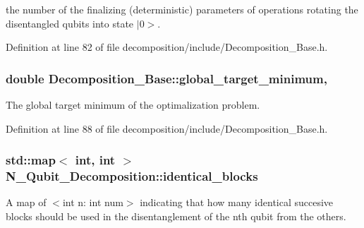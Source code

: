 the number of the finalizing (deterministic) parameters of operations rotating the disentangled qubits into state $\vert$0$>$. 



Definition at line 82 of file decomposition/include/\+Decomposition\+\_\+\+Base.\+h.

\subsubsection[{\texorpdfstring{global\+\_\+target\+\_\+minimum}{global_target_minimum}}]{\setlength{\rightskip}{0pt plus 5cm}double Decomposition\+\_\+\+Base\+::global\+\_\+target\+\_\+minimum\hspace{0.3cm}{\ttfamily [protected]}, {\ttfamily [inherited]}}\hypertarget{class_decomposition___base_a6bc9e026221fab165ecc56f287d731a8}{}\label{class_decomposition___base_a6bc9e026221fab165ecc56f287d731a8}


The global target minimum of the optimalization problem. 



Definition at line 88 of file decomposition/include/\+Decomposition\+\_\+\+Base.\+h.

\subsubsection[{\texorpdfstring{identical\+\_\+blocks}{identical_blocks}}]{\setlength{\rightskip}{0pt plus 5cm}std\+::map$<$ int, int $>$ N\+\_\+\+Qubit\+\_\+\+Decomposition\+::identical\+\_\+blocks\hspace{0.3cm}{\ttfamily [protected]}}\hypertarget{class_n___qubit___decomposition_a92081a657b7bd6877831538a67f1d65e}{}\label{class_n___qubit___decomposition_a92081a657b7bd6877831538a67f1d65e}


A map of $<$int n\+: int num$>$ indicating that how many identical succesive blocks should be used in the disentanglement of the nth qubit from the others. 




